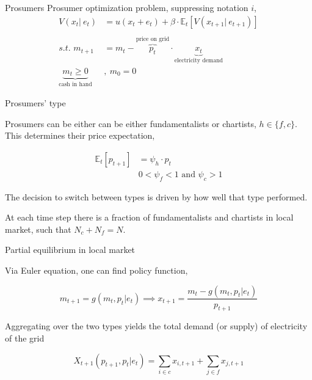 \documentclass[xcolor={svgnames}]{beamer}
\newcommand{\E}{\mathbb{E}}
\begin{document}
\begin{frame}{Prosumers}
    Prosumer optimization problem, suppressing notation $i$,
    \begin{equation}
        \begin{split}
            V(x_t \vert \ e_t) &= u(x_t + e_t) + \beta \cdot \E_t\left[ V(x_{t+1} \vert \ e_{t + 1} ) \right] \\
            \\
            \textit{s.t. } m_{t+1} &= m_{t} - \overbrace{p_{t}}^{\text{price on grid}} \cdot \underbrace{x_{t}}_{\text{electricity demand}}\\
            \underbrace{m_t  \geq 0}_{\text{cash in hand}}&, \ m_0 = 0
        \end{split}
    \end{equation}
\end{frame}

\begin{frame}{Prosumers' type}

    Prosumers can be either can be either fundamentalists or chartists, $h \in \{f, c\}$. This determines their price expectation,

    \begin{equation}
        \begin{split}
            \E_t[p_{t+1}] &= \psi_h \cdot p_t \\
            &0 < \psi_f < 1 \text{ and } \psi_c > 1
        \end{split}
    \end{equation}


    The decision to switch between types is driven by how well that type performed.

    At each time step there is a fraction of fundamentalists and chartists in local market, such that $N_c + N_f = N$.

\end{frame}


\begin{frame}{Partial equilibrium in local market}

    Via Euler equation, one can find policy function,

    \begin{equation}
        m_{t+1} = g(m_t, p_t \vert e_t) \implies x_{t+1} = \frac{m_t - g(m_t, p_t \vert e_t)}{p_{t+1}}
    \end{equation}

    Aggregating over the two types yields the total demand (or supply) of electricity of the grid

    \begin{equation}
        X_{t+1}(p_{t+1}, p_t \vert e_t) = \sum_{i \in c} x_{i, t+1} + \sum_{j \in f} x_{j, t+1}
    \end{equation}

\end{frame}
\end{document}
